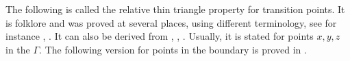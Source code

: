 \documentclass{amsart}
\newtheorem{lem}[thm]{Lemma}
\theoremstyle{definition}
\theoremstyle{remark}
\begin{document}







The following is called the relative thin triangle property for transition points.
It is folklore and was proved at several places, using different terminology, see for instance \cite[Proposition~7.1.1]{GePoGGD}, \cite[Proposition~4.6]{Sistometricrelhyp}.
It can also be derived from \cite[Theorem~1.12]{DrutuSapir}, \cite[Section~8]{Hruska}, \cite[Proposition~3.15]{Osin}.
Usually, it is stated for points $x,y,z$ in the $\Gamma$.
The following version for points in the boundary is proved in \cite[Lemma~2.4]{DG20}.
\end{document}
